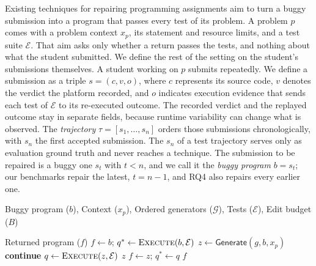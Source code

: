 \documentclass[10pt,conference]{IEEEtran}
\begin{document}
Existing techniques for repairing programming assignments aim to turn a buggy submission into a program that passes every test of its problem. A problem \(p\) comes with a problem context \(x_p\), its statement and resource limits, and a test suite \(\mathcal E\). That aim asks only whether a return passes the tests, and nothing about what the student submitted. We define the rest of the setting on the student's submissions themselves. A student working on \(p\) submits repeatedly. We define a submission as a triple \(s=(c,v,o)\), where \(c\) represents its source code, \(v\) denotes the verdict the platform recorded, and \(o\) indicates execution evidence that sends each test of \(\mathcal E\) to its re-executed outcome. The recorded verdict and the replayed outcome stay in separate fields, because runtime variability can change what is observed. The \emph{trajectory} \(\tau=[s_1,\ldots,s_n]\) orders those submissions chronologically, with \(s_n\) the first accepted submission. The \(s_n\) of a test trajectory serves only as evaluation ground truth and never reaches a technique. The submission to be repaired is a buggy one \(s_t\) with \(t<n\), and we call it the \emph{buggy program} \(b=s_t\); our benchmarks repair the latest, \(t=n-1\), and RQ4 also repairs every earlier one.

\begin{algorithm}[h]
\caption{Automated Program Repair for Programming Assignments}
\label{alg:generic}
\footnotesize
\begin{algorithmic}[1]
\item[\textbf{Input:}] Buggy program ($b$), Context ($x_p$), Ordered generators ($\mathcal G$), Tests ($\mathcal E$), Edit budget ($B$)
\item[\textbf{Output:}] Returned program ($f$)
\State $f\gets b$; $q^*\gets\textsc{Execute}(b,\mathcal E)$
 \State $z\gets\mathsf{Generate}(g,b,x_p)$
  \State \textbf{continue}
 \EndIf
 \State $q\gets\textsc{Execute}(z,\mathcal E)$
  \State \Return $z$ \EndIf
  \State $f\gets z$; $q^*\gets q$
 \EndIf
\EndFor
\State \Return $f$
\EndProcedure
\end{algorithmic}
\end{algorithm}
\end{document}
